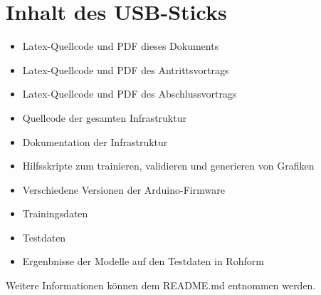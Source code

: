 \chapter{Inhalt des USB-Sticks}
\begin{itemize}
    \item Latex-Quellcode und PDF dieses Dokuments
    \item Latex-Quellcode und PDF des Antrittsvortrags
    \item Latex-Quellcode und PDF des Abschlussvortrags
    \item Quellcode der gesamten Infrastruktur
    \item Dokumentation der Infrastruktur
    \item Hilfsskripte zum trainieren, validieren und generieren von Grafiken
    \item Verschiedene Versionen der Arduino-Firmware
    \item Trainingsdaten
    \item Testdaten
    \item Ergenbnisse der Modelle auf den Testdaten in Rohform
\end{itemize}
Weitere Informationen können dem README.md entnommen werden.